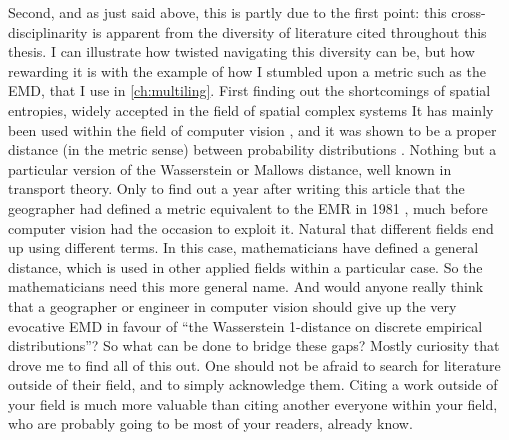 \documentclass[../thesis.tex]{subfiles}
\begin{document}
Second, and as just said above, this is partly due to the first point: this
cross-disciplinarity is apparent from the diversity of literature cited throughout this
thesis. I can illustrate how twisted navigating this diversity can be, but how rewarding
it is with the example of how I stumbled upon a metric such as the \ac{EMD}, that I use
in \cref{ch:multiling}.
First finding out the shortcomings of spatial entropies, widely accepted in the field of
spatial complex systems \cite{BattyEntropyComplexity2014} It has mainly been used within
the field of computer vision \cite{RubnerMetricDistributions1998}, and it was shown to
be a proper distance (in the metric sense) between probability distributions
\cite{LevinaEarthMover2001}. Nothing but a particular version of the Wasserstein or
Mallows distance, well known in transport theory. Only to find out a year after writing
this article that the geographer
 had defined a metric equivalent
to the \ac{EMR} in 1981 \cite{JakubsDistancebasedSegregation1981}, much before computer
vision had the occasion to exploit it. Natural that different fields end up using
different terms. In this case, mathematicians have defined a general distance, which is
used in other applied fields within a particular case. So the mathematicians need this
more general name. And would anyone really think that a geographer or engineer in
computer vision should give up the very evocative \ac{EMD} in favour of ``the
Wasserstein 1-distance on discrete empirical distributions''? So what can be done to
bridge these gaps? Mostly curiosity that drove me to find all of this out. One should
not be afraid to search for literature outside of their field, and to simply acknowledge
them. Citing a work outside of your field is much more valuable than citing another
everyone within your field, who are probably going to be most of your readers, already
know.
\end{document}
